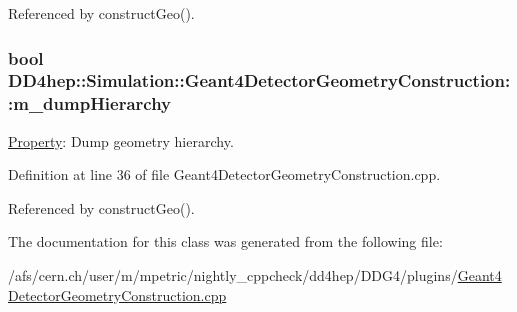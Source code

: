 Referenced by constructGeo().\hypertarget{class_d_d4hep_1_1_simulation_1_1_geant4_detector_geometry_construction_ac003c6513973e596d5d214206c3f8d99}{
\subsubsection[{m\_\-dumpHierarchy}]{\setlength{\rightskip}{0pt plus 5cm}bool {\bf DD4hep::Simulation::Geant4DetectorGeometryConstruction::m\_\-dumpHierarchy}}}
\label{class_d_d4hep_1_1_simulation_1_1_geant4_detector_geometry_construction_ac003c6513973e596d5d214206c3f8d99}


\hyperlink{class_d_d4hep_1_1_property}{Property}: Dump geometry hierarchy. 

Definition at line 36 of file Geant4DetectorGeometryConstruction.cpp.

Referenced by constructGeo().

The documentation for this class was generated from the following file:\begin{DoxyCompactItemize}
\item 
/afs/cern.ch/user/m/mpetric/nightly\_\-cppcheck/dd4hep/DDG4/plugins/\hyperlink{_geant4_detector_geometry_construction_8cpp}{Geant4DetectorGeometryConstruction.cpp}\end{DoxyCompactItemize}

